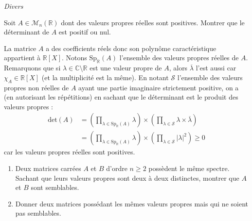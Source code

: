 \documentclass[a4paper,10pt]{report}
\begin{document}
\medskip

\begin{center}
\textit{{ {\large Divers}}}
\end{center}

\medskip

\begin{Exercice}{} Soit $A \in \mathcal{M}_{n}(\mathbb{R})$ dont des valeurs propres réelles sont positives. Montrer que le déterminant de $A$ est positif ou nul.
\end{Exercice} 

\corr La matrice $A$ a des coefficients réels donc son polynôme caractéristique appartient à $\mathbb{R}[X]$. Notons $\textrm{Sp}_{\mathbb{R}}(A)$ l'ensemble des valeurs propres réelles de $A$. Remarquons que si $\lambda \in \mathbb{C} \setminus \mathbb{R}$ est une valeur propre de $A$, alors $\overline{\lambda}$ l'est aussi car $\chi_A \in \mathbb{R}[X]$ (et la multiplicité est la même). En notant $\mathcal{S}$ l'ensemble des valeurs propres non réelles de $A$ ayant une partie imaginaire strictement positive, on a (en autorisant les répétitions) en sachant que le déterminant est le produit des valeurs propres :
\begin{align*}
 \textrm{det}(A) & = \left(\prod_{ \lambda \in \textrm{Sp}_{\mathbb{R}}(A)} \lambda \right) \times \left(\prod_{ \lambda \in \mathcal{S}} \lambda  \times \overline{\lambda }\right)  \\
&  = \left(\prod_{ \lambda \in \textrm{Sp}_{\mathbb{R}}(A)} \lambda \right) \times \left(\prod_{ \lambda \in \mathcal{S}} \vert \lambda \vert ^2\right) \geq 0 
 \end{align*}
  car les valeurs propres réelles sont positives.


\begin{Exercice}{}
\begin{enumerate}
\item Deux matrices carrées $A$ et $B$ d'ordre $n \geq 2$ possèdent le même spectre. Sachant que leurs valeurs propres sont deux à deux distinctes, montrer que $A$ et $B$ sont semblables.
\item Donner deux matrices possédant les mêmes valeurs propres mais qui ne soient pas semblables.
\end{enumerate}
\end{Exercice} 
\end{document}
